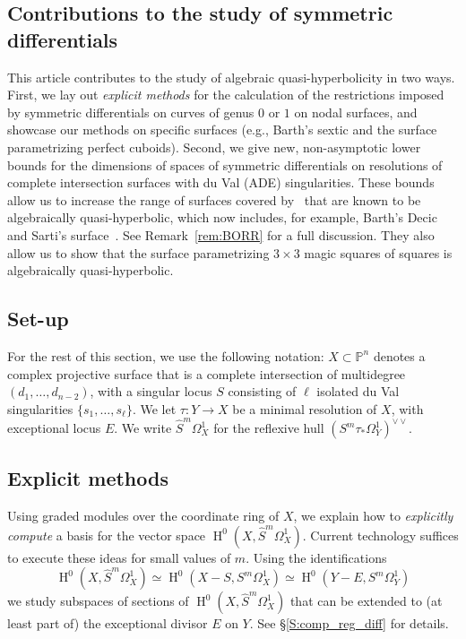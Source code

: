 \documentclass[12pt, reqno]{amsart}
\theoremstyle{definition}
\newcommand{\PP}{{\mathbb P}}
\DeclareMathOperator{\HH}{H}
\numberwithin{equation}{section}
\numberwithin{table}{section}
\begin{document}
\subsection{Contributions to the study of symmetric differentials}
This article contributes to the study of algebraic quasi-hyperbolicity in two ways.  First, we lay out \emph{explicit methods} for the calculation of the restrictions imposed by symmetric differentials on curves of genus $0$ or $1$ on nodal surfaces, and showcase our methods on specific surfaces (e.g., Barth's sextic and the surface parametrizing perfect cuboids).  Second, we give new, non-asymptotic lower bounds for the dimensions of spaces of symmetric differentials on resolutions of complete intersection surfaces with du Val (ADE) singularities.  These bounds allow us to increase the range of surfaces covered by~\cite{BO,RoulleauRousseau} that are known to be algebraically quasi-hyperbolic, which now includes, for example, Barth's Decic~\cite{Barth1996} and Sarti's surface~\cite{Sarti2001}. See Remark~\ref{rem:BORR} for a full discussion. They also allow us to show that the surface parametrizing $3\times 3$ magic squares of squares is algebraically quasi-hyperbolic.

\subsection{Set-up}
\label{ss:set-up}
For the rest of this section, we use the following notation: $X\subset \PP^n$ denotes a complex projective surface that is a complete intersection of multidegree $(d_1,\ldots,d_{n-2})$, with a singular locus $S$  consisting of $\ell$ isolated du Val singularities $\{s_1,\ldots,s_\ell\}$. We let $\tau\colon Y\to X$ be a minimal resolution of $X$, with exceptional locus $E$. We write $\hat{S}^m\Omega_X^1$ for the reflexive hull $(S^m\tau_*\Omega_Y^1)^{\vee\vee}$.

\subsection{Explicit methods}
Using graded modules over the coordinate ring of $X$, we explain how to  \emph{explicitly compute} a basis for the vector space $\HH^0(X,\hat{S}^m\Omega^1_X)$.  Current technology suffices to execute these ideas for small values of $m$. Using the identifications
\[
\HH^0(X,\hat{S}^m\Omega^1_X) \simeq \HH^0(X- S,S^m\Omega^1_X)\simeq \HH^0(Y- E,S^m\Omega^1_Y) 
\]
we study subspaces of sections of $\HH^0(X,\hat{S}^m\Omega^1_X)$ that can be extended to (at least part of) the exceptional divisor $E$ on $Y$.  See \S\ref{S:comp_reg_diff} for details.
\end{document}
